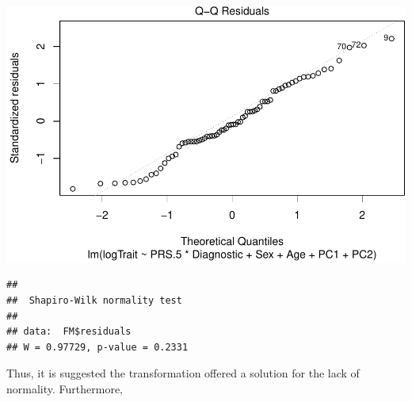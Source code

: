 \documentclass[
]{article}
\newenvironment{Shaded}{\begin{snugshade}}{\end{snugshade}}
\newcommand{\AttributeTok}[1]{\textcolor[rgb]{0.77,0.63,0.00}{#1}}
\newcommand{\CommentTok}[1]{\textcolor[rgb]{0.56,0.35,0.01}{\textit{#1}}}
\newcommand{\DecValTok}[1]{\textcolor[rgb]{0.00,0.00,0.81}{#1}}
\newcommand{\FloatTok}[1]{\textcolor[rgb]{0.00,0.00,0.81}{#1}}
\newcommand{\FunctionTok}[1]{\textcolor[rgb]{0.00,0.00,0.00}{#1}}
\newcommand{\NormalTok}[1]{#1}
\newcommand{\OtherTok}[1]{\textcolor[rgb]{0.56,0.35,0.01}{#1}}
\newcommand{\SpecialCharTok}[1]{\textcolor[rgb]{0.00,0.00,0.00}{#1}}
\begin{document}
\begin{Shaded}
\end{Shaded}

\includegraphics{WorkingExample2_code_files/figure-latex/unnamed-chunk-12-1.pdf}

\begin{Shaded}
\end{Shaded}

\begin{verbatim}
## 
##  Shapiro-Wilk normality test
## 
## data:  FM$residuals
## W = 0.97729, p-value = 0.2331
\end{verbatim}

Thus, it is suggested the transformation offered a solution for the lack
of normality. Furthermore,
\end{document}
